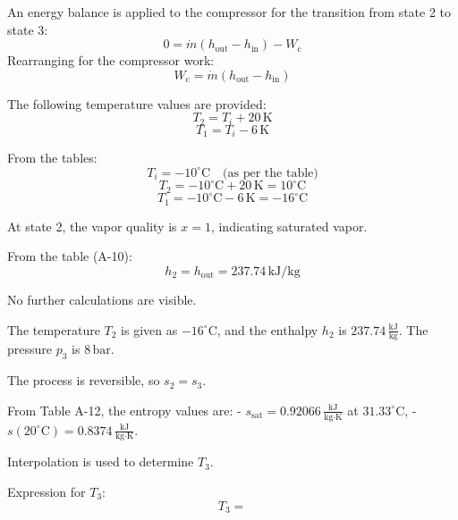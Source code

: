 An energy balance is applied to the compressor for the transition from state 2 to state 3:  
\[
0 = \dot{m} \left( h_{\text{out}} - h_{\text{in}} \right) - W_{\text{c}}
\]  
Rearranging for the compressor work:  
\[
W_{\text{c}} = \dot{m} \left( h_{\text{out}} - h_{\text{in}} \right)
\]  

The following temperature values are provided:  
\[
T_2 = T_i + 20 \, \text{K}
\]  
\[
T_1 = T_i - 6 \, \text{K}
\]  

From the tables:  
\[
T_i = -10^\circ\text{C} \quad \text{(as per the table)}
\]  
\[
T_2 = -10^\circ\text{C} + 20 \, \text{K} = 10^\circ\text{C}
\]  
\[
T_1 = -10^\circ\text{C} - 6 \, \text{K} = -16^\circ\text{C}
\]  

At state 2, the vapor quality is \(x = 1\), indicating saturated vapor.  

From the table (A-10):  
\[
h_2 = h_{\text{out}} = 237.74 \, \text{kJ/kg}
\]  

No further calculations are visible.

The temperature \( T_2 \) is given as \( -16^\circ\text{C} \), and the enthalpy \( h_2 \) is \( 237.74 \, \frac{\text{kJ}}{\text{kg}} \). The pressure \( p_3 \) is \( 8 \, \text{bar} \).

The process is reversible, so \( s_2 = s_3 \).

From Table A-12, the entropy values are:
- \( s_{\text{sat}} = 0.92066 \, \frac{\text{kJ}}{\text{kg·K}} \) at \( 31.33^\circ\text{C} \),
- \( s(20^\circ\text{C}) = 0.8374 \, \frac{\text{kJ}}{\text{kg·K}} \).

Interpolation is used to determine \( T_3 \).

Expression for \( T_3 \):  
\[
T_3 =
\]